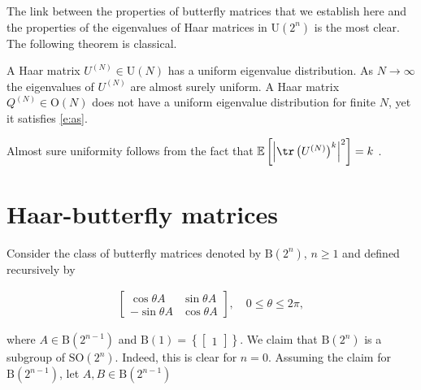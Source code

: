 The link between the properties of butterfly matrices that we establish here and the properties of the eigenvalues of Haar matrices in $\mathrm{U}(2^n)$ is the most clear. The following theorem is classical.

\begin{theorem}
A Haar matrix $U^{(N)} \in \mathrm{U}(N)$ has a uniform eigenvalue distribution.  As $N \to \infty$ the eigenvalues of $U^{(N)}$ are almost surely uniform.  A Haar matrix $Q^{(N)} \in \mathrm{O}(N)$ does not have a uniform eigenvalue distribution for finite $N$, yet it satisfies \eqref{e:as}.  
\end{theorem}

 Almost sure uniformity follows from the fact that $\mathbb E \left[\left| \tr \left( U^{(N)} \right)^k \right|^2 \right] = k$ \cite{Diaconis1994} .       

\section{Haar-butterfly matrices}\label{s:haarbutt}

Consider the class of butterfly matrices denoted by $\mathrm B(2^n)$, $n \geq 1$ and defined recursively by

\begin{align}
\begin{bmatrix} \cos \theta A & \sin \theta A \\ - \sin \theta A & \cos \theta A \end{bmatrix}, \quad 0 \leq \theta \leq 2 \pi,
\end{align}

where $A \in \mathrm B(2^{n-1})$ and  $\mathrm B(1) = \left\{

\begin{bmatrix} 1 \end{bmatrix}

 \right\}$.  We claim that $\mathrm B(2^n)$ is a subgroup of $\mathrm{SO}(2^n)$.  Indeed, this is clear for $n = 0$.  Assuming the claim for $\mathrm B(2^{n-1})$, let $A,B \in \mathrm B(2^{n-1})$

